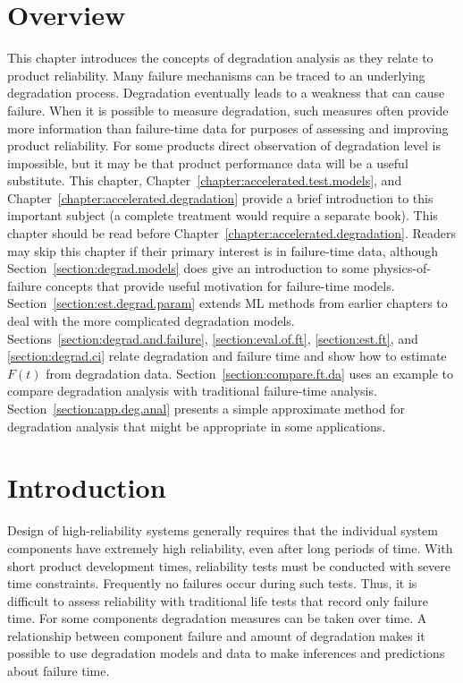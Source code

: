 \section*{Overview}
This chapter introduces the concepts of degradation analysis as they relate
to product reliability. Many failure mechanisms can be traced to an 
underlying degradation process. Degradation eventually leads to a weakness
that can cause failure. When it is possible to measure degradation,
such measures often provide more information than failure-time data for
purposes of assessing and improving product reliability. For some 
products direct observation of degradation level is impossible, but it
may be that product performance data will be a useful substitute. 
This chapter, Chapter~\ref{chapter:accelerated.test.models}, and 
Chapter~\ref{chapter:accelerated.degradation} provide a brief introduction
to this important subject (a complete treatment would
require a separate book).  This chapter should be read before
Chapter~\ref{chapter:accelerated.degradation}.  Readers may skip this
chapter if their primary interest is in failure-time data, although
Section~\ref{section:degrad.models} does
give an introduction to some physics-of-failure concepts that provide
useful motivation for failure-time models.
Section~\ref{section:est.degrad.param} extends ML methods from earlier
chapters to deal with the more complicated degradation models.
Sections~\ref{section:degrad.and.failure},
\ref{section:eval.of.ft}, \ref{section:est.ft}, and \ref{section:degrad.ci} 
relate degradation and failure time and show how to estimate $F(t)$
from degradation data.  Section~\ref{section:compare.ft.da} uses an
example to compare degradation analysis with traditional
failure-time analysis.  Section~\ref{section:app.deg.anal} presents
a simple approximate method for degradation analysis that might be
appropriate in some applications.

\section{Introduction}
Design of high-reliability systems generally requires that the
individual system components have extremely high reliability, even
after long periods of time.  With short product development times,
reliability tests must be conducted with severe time constraints.
Frequently no failures occur during such tests.  Thus, it is difficult
to assess reliability with traditional life tests that record only
failure time.  For some components degradation measures can be
taken over time.  A relationship between component failure and amount
of degradation makes it possible to use degradation models and data to
make inferences and predictions about failure time.

